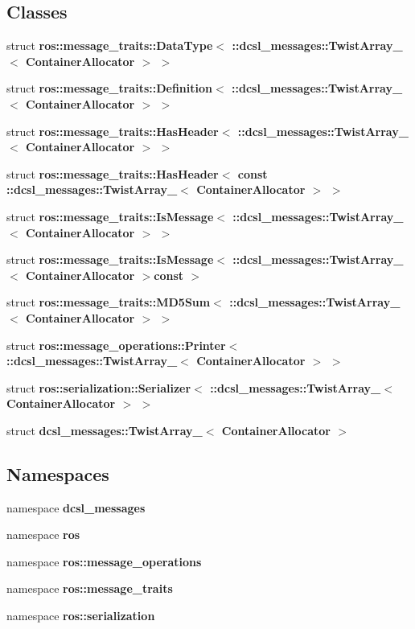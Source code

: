 \subsection*{\-Classes}
\begin{DoxyCompactItemize}
\item 
struct {\bf ros\-::message\-\_\-traits\-::\-Data\-Type$<$ \-::dcsl\-\_\-messages\-::\-Twist\-Array\-\_\-$<$ Container\-Allocator $>$ $>$}
\item 
struct {\bf ros\-::message\-\_\-traits\-::\-Definition$<$ \-::dcsl\-\_\-messages\-::\-Twist\-Array\-\_\-$<$ Container\-Allocator $>$ $>$}
\item 
struct {\bf ros\-::message\-\_\-traits\-::\-Has\-Header$<$ \-::dcsl\-\_\-messages\-::\-Twist\-Array\-\_\-$<$ Container\-Allocator $>$ $>$}
\item 
struct {\bf ros\-::message\-\_\-traits\-::\-Has\-Header$<$ const \-::dcsl\-\_\-messages\-::\-Twist\-Array\-\_\-$<$ Container\-Allocator $>$ $>$}
\item 
struct {\bf ros\-::message\-\_\-traits\-::\-Is\-Message$<$ \-::dcsl\-\_\-messages\-::\-Twist\-Array\-\_\-$<$ Container\-Allocator $>$ $>$}
\item 
struct {\bf ros\-::message\-\_\-traits\-::\-Is\-Message$<$ \-::dcsl\-\_\-messages\-::\-Twist\-Array\-\_\-$<$ Container\-Allocator $>$const  $>$}
\item 
struct {\bf ros\-::message\-\_\-traits\-::\-M\-D5\-Sum$<$ \-::dcsl\-\_\-messages\-::\-Twist\-Array\-\_\-$<$ Container\-Allocator $>$ $>$}
\item 
struct {\bf ros\-::message\-\_\-operations\-::\-Printer$<$ \-::dcsl\-\_\-messages\-::\-Twist\-Array\-\_\-$<$ Container\-Allocator $>$ $>$}
\item 
struct {\bf ros\-::serialization\-::\-Serializer$<$ \-::dcsl\-\_\-messages\-::\-Twist\-Array\-\_\-$<$ Container\-Allocator $>$ $>$}
\item 
struct {\bf dcsl\-\_\-messages\-::\-Twist\-Array\-\_\-$<$ Container\-Allocator $>$}
\end{DoxyCompactItemize}
\subsection*{\-Namespaces}
\begin{DoxyCompactItemize}
\item 
namespace {\bf dcsl\-\_\-messages}
\item 
namespace {\bf ros}
\item 
namespace {\bf ros\-::message\-\_\-operations}
\item 
namespace {\bf ros\-::message\-\_\-traits}
\item 
namespace {\bf ros\-::serialization}
\end{DoxyCompactItemize}
